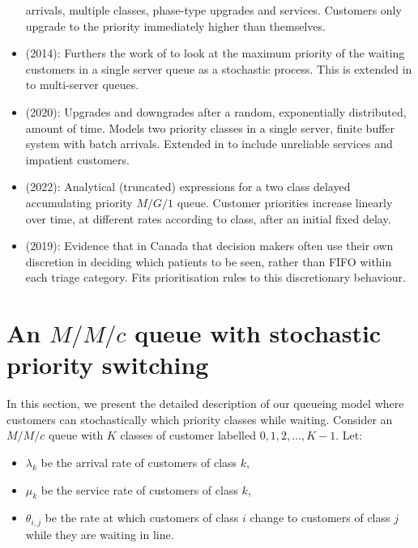 \documentclass{article}
\begin{document}
\begin{itemize}
      arrivals, multiple classes, phase-type upgrades and services.
        Customers only upgrade to the priority immediately higher than
        themselves.
  \item \cite{stanford14} (2014): Furthers the work of \cite{kleinrock164} to
      look at the maximum priority of the waiting customers in a single server
        queue as a stochastic process. This is extended in \cite{sharif14} to
        multi-server queues.
  \item \cite{klimenok20} (2020): Upgrades and downgrades after a random,
      exponentially distributed, amount of time. Models two priority classes
        in a single server, finite buffer system with batch arrivals. Extended
        in \cite{dudin21} to include unreliable services and impatient
        customers. 
  \item \cite{bilodeau22} (2022): Analytical (truncated) expressions for
      a two class delayed accumulating priority $M/G/1$ queue. Customer
        priorities increase linearly over time, at different rates
        according to class, after an initial fixed delay.
\end{itemize}


\begin{itemize}
  \item \cite{ding19} (2019): Evidence that in Canada that decision makers
      often use their own discretion in deciding which patients to be seen,
        rather than FIFO within each triage category. Fits prioritisation rules
        to this discretionary behaviour.
\end{itemize}




\section{An $M/M/c$ queue with stochastic priority switching}\label{sec:system}
In this section, we present the detailed description of our queueing model where
customers can stochastically which priority classes while waiting.
Consider an $M/M/c$ queue with $K$ classes of customer labelled
$0, 1, 2, \dots, K-1$. Let:

\begin{itemize}
  \item $\lambda_k$ be the arrival rate of customers of class $k$,
  \item $\mu_k$ be the service rate of customers of class $k$,
  \item $\theta_{i,j}$ be the rate at which customers of class $i$ change
  to customers of class $j$ while they are waiting in line.
\end{itemize}
\end{document}
